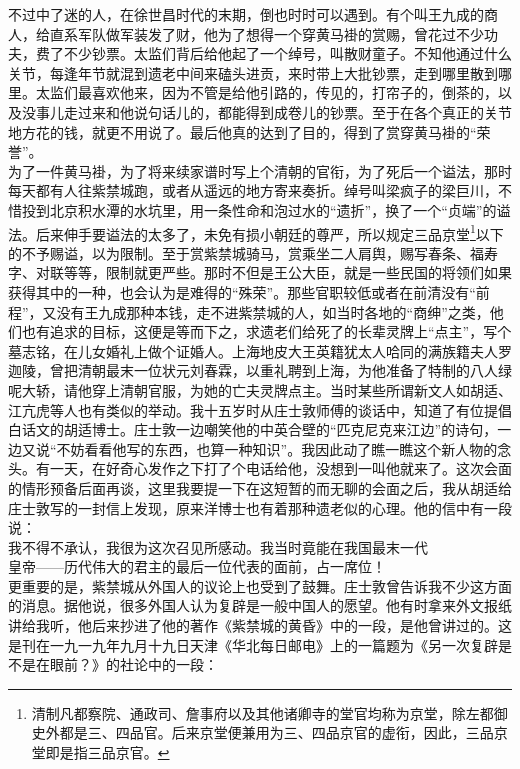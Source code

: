不过中了迷的人，在徐世昌时代的末期，倒也时时可以遇到。有个叫王九成的商人，给直系军队做军装发了财，他为了想得一个穿黄马褂的赏赐，曾花过不少功夫，费了不少钞票。太监们背后给他起了一个绰号，叫散财童子。不知他通过什么关节，每逢年节就混到遗老中间来磕头进贡，来时带上大批钞票，走到哪里散到哪里。太监们最喜欢他来，因为不管是给他引路的，传见的，打帘子的，倒茶的，以及没事儿走过来和他说句话儿的，都能得到成卷儿的钞票。至于在各个真正的关节地方花的钱，就更不用说了。最后他真的达到了目的，得到了赏穿黄马褂的“荣誉”。\\

为了一件黄马褂，为了将来续家谱时写上个清朝的官衔，为了死后一个谥法，那时每天都有人往紫禁城跑，或者从遥远的地方寄来奏折。绰号叫梁疯子的梁巨川，不惜投到北京积水潭的水坑里，用一条性命和泡过水的“遗折”，换了一个“贞端”的谥法。后来伸手要谥法的太多了，未免有损小朝廷的尊严，所以规定三品京堂\footnote{清制凡都察院、通政司、詹事府以及其他诸卿寺的堂官均称为京堂，除左都御史外都是三、四品官。后来京堂便兼用为三、四品京官的虚衔，因此，三品京堂即是指三品京官。}以下的不予赐谥，以为限制。至于赏紫禁城骑马，赏乘坐二人肩舆，赐写春条、福寿字、对联等等，限制就更严些。那时不但是王公大臣，就是一些民国的将领们如果获得其中的一种，也会认为是难得的“殊荣”。那些官职较低或者在前清没有“前程”，又没有王九成那种本钱，走不进紫禁城的人，如当时各地的“商绅”之类，他们也有追求的目标，这便是等而下之，求遗老们给死了的长辈灵牌上“点主”，写个墓志铭，在儿女婚礼上做个证婚人。上海地皮大王英籍犹太人哈同的满族籍夫人罗迦陵，曾把清朝最末一位状元刘春霖，以重礼聘到上海，为他准备了特制的八人绿呢大轿，请他穿上清朝官服，为她的亡夫灵牌点主。当时某些所谓新文人如胡适、江亢虎等人也有类似的举动。我十五岁时从庄士敦师傅的谈话中，知道了有位提倡白话文的胡适博士。庄士敦一边嘲笑他的中英合壁的“匹克尼克来江边”的诗句，一边又说“不妨看看他写的东西，也算一种知识”。我因此动了瞧一瞧这个新人物的念头。有一天，在好奇心发作之下打了个电话给他，没想到一叫他就来了。这次会面的情形预备后面再谈，这里我要提一下在这短暂的而无聊的会面之后，我从胡适给庄士敦写的一封信上发现，原来洋博士也有着那种遗老似的心理。他的信中有一段说：\\

我不得不承认，我很为这次召见所感动。我当时竟能在我国最末一代\\

皇帝——历代伟大的君主的最后一位代表的面前，占一席位！\\

更重要的是，紫禁城从外国人的议论上也受到了鼓舞。庄士敦曾告诉我不少这方面的消息。据他说，很多外国人认为复辟是一般中国人的愿望。他有时拿来外文报纸讲给我听，他后来抄进了他的著作《紫禁城的黄昏》中的一段，是他曾讲过的。这是刊在一九一九年九月十九日天津《华北每日邮电》上的一篇题为《另一次复辟是不是在眼前？》的社论中的一段：\\

